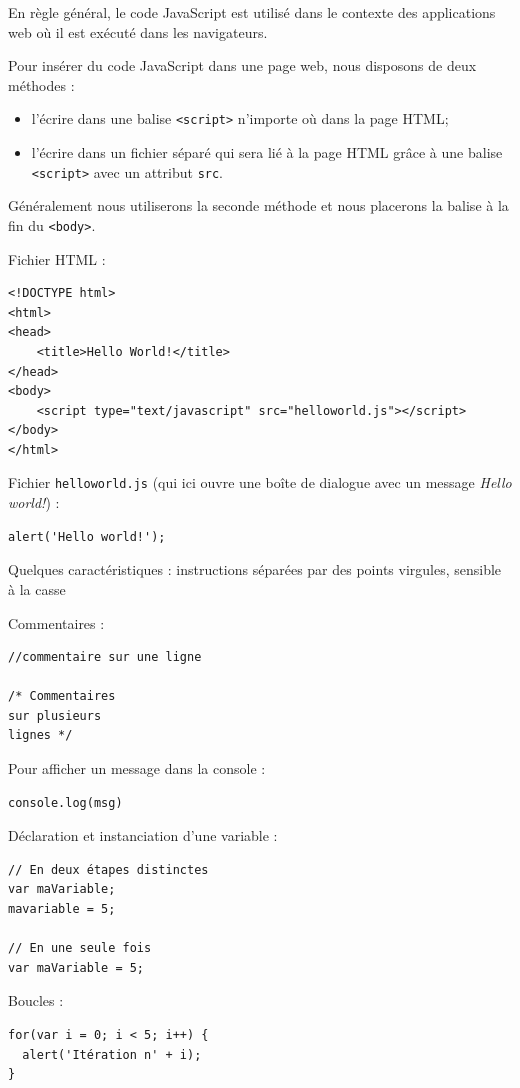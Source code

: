 \documentclass[11pt]{article}
\newcommand{\code}[1]{\lstinline{#1}}
\begin{document}
En règle général, le code JavaScript est utilisé dans le contexte des applications web où il est exécuté dans les navigateurs.

Pour insérer du code JavaScript dans une page web, nous disposons de deux méthodes :
\begin{itemize}
	\item l'écrire dans une balise \code{<script>} n'importe où dans la page HTML;
	\item l'écrire dans un fichier séparé qui sera lié à la page HTML grâce à une balise \code{<script>} avec un attribut \code{src}.
\end{itemize}

Généralement nous utiliserons la seconde méthode et nous placerons la balise à la fin du \code{<body>}.

Fichier HTML :
\begin{lstlisting}
<!DOCTYPE html>
<html>
<head>
    <title>Hello World!</title>
</head>
<body>
	<script type="text/javascript" src="helloworld.js"></script>
</body>
</html>
\end{lstlisting}

Fichier \code{helloworld.js} (qui ici ouvre une boîte de dialogue avec un message \textit{Hello world!}) :
\begin{lstlisting}
alert('Hello world!');
\end{lstlisting}

Quelques caractéristiques : instructions séparées par des points virgules, sensible à la casse

Commentaires :
\begin{lstlisting}
//commentaire sur une ligne

/* Commentaires
sur plusieurs
lignes */
\end{lstlisting} 

Pour afficher un message dans la console :
\begin{lstlisting}
console.log(msg)
\end{lstlisting} 

Déclaration et instanciation d'une variable : 
\begin{lstlisting}
// En deux étapes distinctes
var maVariable;
mavariable = 5;

// En une seule fois
var maVariable = 5;
\end{lstlisting} 

Boucles :
\begin{lstlisting}
for(var i = 0; i < 5; i++) {
  alert('Itération n' + i);
}
\end{lstlisting} 
\end{document}

